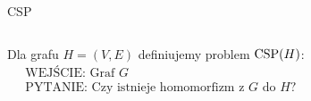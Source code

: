 \begin{frame}{CSP}

\begin{columns}

    Dla grafu \(H=(V,E)\) definiujemy problem \(\text{CSP}(H)\):
    \begin{align*}
        & \text{WEJŚCIE: Graf } G \\
        & \text{PYTANIE: Czy istnieje homomorfizm z } G \text{ do } H?
    \end{align*}

    \begin{figure}
        \centering
        
    \end{figure}
\end{columns}
\vspace{3em}

\end{frame}




